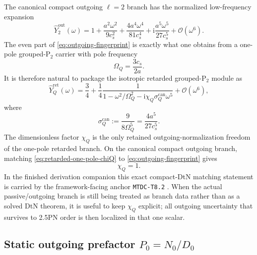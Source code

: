 \documentclass[11pt]{article}
\theoremstyle{definition}
\newcommand{\ii}{\mathrm{i}}
\newcommand{\Ptwo}{\ensuremath{\mathrm{P}_2}}
\newcommand{\out}{\mathrm{out}}
\newcommand{\Yout}{\ensuremath{\widehat Y_2^{\out}}}
\newcommand{\cO}{\mathcal O}
\begin{document}
The canonical compact outgoing $\ell=2$ branch has the normalized low-frequency expansion
\begin{equation}
\Yout(\omega)
=
1
+
\frac{a^2\omega^2}{9c_s^2}
+
\frac{4a^4\omega^4}{81c_s^4}
+
\ii\frac{a^5\omega^5}{27c_s^5}
+
\cO(\omega^6).
\label{eq:outgoing-fingerprint}
\end{equation}
The even part of \eqref{eq:outgoing-fingerprint} is exactly what one obtains from a one-pole grouped-$\Ptwo$ carrier with pole frequency
\begin{equation}
\Omega_Q=\frac{3c_s}{2a}.
\label{eq:outgoing-OmegaQ}
\end{equation}
It is therefore natural to package the isotropic retarded grouped-$\Ptwo$ module as
\begin{equation}
\widehat Y_Q^{\mathrm{ret}}(\omega)
=
\frac34
+
\frac14\frac{1}{1-\omega^2/\Omega_Q^2-\ii\chi_Q\sigma_Q^{\mathrm{can}}\omega^5}
+
\cO(\omega^6),
\label{eq:retarded-one-pole-chiQ}
\end{equation}
where
\begin{equation}
\sigma_Q^{\mathrm{can}}:=\frac{9}{8\Omega_Q^5}=\frac{4a^5}{27c_s^5}.
\label{eq:canonical-sigmaQ}
\end{equation}
The dimensionless factor $\chi_Q$ is the only retained outgoing-normalization freedom of the one-pole retarded branch. On the canonical compact outgoing branch, matching \eqref{eq:retarded-one-pole-chiQ} to \eqref{eq:outgoing-fingerprint} gives
\begin{equation}
\chi_Q=1.
\label{eq:canonical-chiQ}
\end{equation}
In the finished derivation companion this exact compact-DtN matching statement is carried by the framework-facing anchor \texttt{MTDC-T8.2} \cite{Norris2026PDELedger}.
When the actual passive/outgoing branch is still being treated as branch data rather than as a solved DtN theorem, it is useful to keep $\chi_Q$ explicit; all outgoing uncertainty that survives to 2.5PN order is then localized in that one scalar.

\subsection{Static outgoing prefactor \texorpdfstring{$P_0=N_0/D_0$}{P0=N0/D0}}
\end{document}
